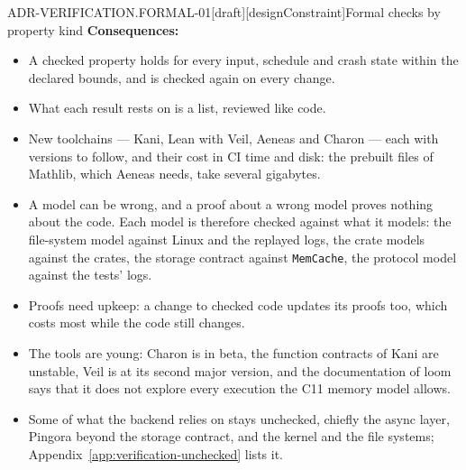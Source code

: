 \begin{requirement}{ADR-VERIFICATION.FORMAL-01}[draft][designConstraint]{Formal checks by property kind}
  \textbf{Consequences:}
  \begin{itemize}
    \item[+] A checked property holds for every input, schedule and crash
      state within the declared bounds, and is checked again on every change.
    \item[+] What each result rests on is a list, reviewed like code.
    \item[--] New toolchains --- Kani, Lean with Veil, Aeneas and Charon ---
      each with versions to follow, and their cost in CI time and disk: the
      prebuilt files of Mathlib, which Aeneas needs, take several gigabytes.
    \item[--] A model can be wrong, and a proof about a wrong model proves
      nothing about the code. Each model is therefore checked against what it
      models: the file-system model against Linux and the replayed logs, the
      crate models against the crates, the storage contract against
      \texttt{MemCache}, the protocol model against the tests' logs.
    \item[--] Proofs need upkeep: a change to checked code updates its proofs
      too, which costs most while the code still changes.
    \item[--] The tools are young: Charon is in beta, the function contracts
      of Kani are unstable, Veil is at its second major version, and the
      documentation of loom says that it does not explore every execution
      the C11 memory model allows.
    \item[--] Some of what the backend relies on stays unchecked, chiefly the
      async layer, Pingora beyond the storage contract, and the kernel and
      the file systems; Appendix~\ref{app:verification-unchecked} lists it.
  \end{itemize}



\end{requirement}
